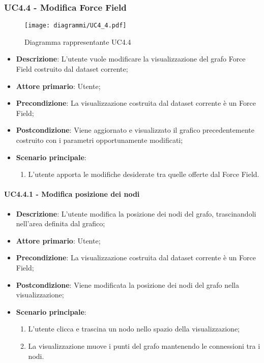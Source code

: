 \newpage
\subsubsection{UC4.4 - Modifica Force Field}
\label{ssub:uc4.4}
\begin{figure}[h]
    \centering
    \texttt{[image: diagrammi/UC4\_4.pdf]}
    \caption{Diagramma rappresentante UC4.4}
    \label{fig:UC4.4}
\end{figure}


\begin{itemize}
    \item \textbf{Descrizione}: L’utente vuole modificare la visualizzazione del grafo Force Field
                                costruito dal dataset corrente;

    \item \textbf{Attore primario}: Utente;

    \item \textbf{Precondizione}:   La visualizzazione costruita dal dataset corrente è un Force Field;

    \item \textbf{Postcondizione}:  Viene aggiornato e visualizzato il grafico precedentemente costruito con i parametri opportunamente modificati;

    \item \textbf{Scenario principale}: 
    \begin{enumerate}
        \item L'utente apporta le modifiche desiderate tra quelle offerte dal Force Field.
    \end{enumerate}
\end{itemize}

\paragraph{UC4.4.1 - Modifica posizione dei nodi}
\label{par:uc4.4.1}
\begin{itemize}
    \item \textbf{Descrizione}: L’utente modifica la posizione dei nodi del grafo, trascinandoli nell'area definita dal grafico;

    \item \textbf{Attore primario}: Utente;

    \item \textbf{Precondizione}:   La visualizzazione costruita dal dataset corrente è un Force Field;
    \item \textbf{Postcondizione}:  Viene modificata la posizione dei nodi del grafo nella visualizzazione;

	\item \textbf{Scenario principale}:
        \begin{enumerate}
            \item L'utente clicca e trascina un nodo nello spazio della visualizzazione;
            \item La visualizzazione muove i punti del grafo mantenendo le connessioni tra i nodi.
        \end{enumerate}
\end{itemize}

